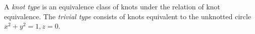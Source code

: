 A \textit{knot type} is an equivalence class of knots under the relation of knot equivalence. The \textit{trivial type} consists of knots equivalent to the unknotted circle $x^2 + y^2 = 1, z = 0$.
